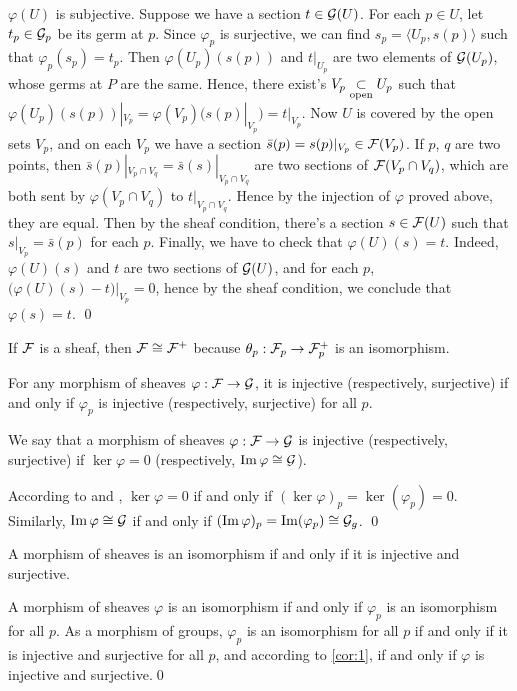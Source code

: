 \documentclass[10pt]{extbook}
\begin{document}
$\varphi(U)$ is subjective. Suppose we have a section $t\in\mathcal{G}(U)$. For each $p\in U$, 
let $t_p\in\mathcal{G}_p$ be its germ at $p$. Since $\varphi_p$ is surjective, we can find $s_p=\langle U_p,s(p)\rangle$ such that $\varphi_p(s_p)=t_p$. Then $\varphi(U_p)(s(p))$ and $t|_{U_p}$ are two elements of $\mathcal{G}(U_p)$, whose germs at $P$ are the same. Hence, there exist's $V_p\underset{\mathrm{open}}{\subset} U_p$ such that $\varphi(U_p)(s(p))|_{V_p}=\varphi(V_p)(s(p)|_{V_p})=t|_{V_p}$. Now $U$ is covered by the open sets $V_p$, and on each $V_p$ we have a section $\bar{s}(p)=s(p)|_{V_p}\in \mathcal{F}(V_p)$. If $p$, $q$ are two points, then $\bar{s}(p)|_{V_p\cap V_q}=\bar{s}(s)|_{V_p\cap V_q}$ are two sections of $\mathcal{F}(V_p\cap V_q)$, which are both sent by $\varphi(V_p\cap V_q)$ to $t|_{V_p\cap V_q}$. Hence by the injection of $\varphi$ proved above, they are equal. Then by the sheaf condition, there's a section $s\in\mathcal{F}(U)$ such that $s|_{V_p}=\bar{s}(p)$ for each $p$. Finally, we have to check that $\varphi(U)(s)=t$. Indeed, $\varphi(U)(s)$ and $t$ are two sections of $\mathcal{G}(U)$, and for each $p$, $\bigl(\varphi(U)(s)-t\bigr)|_{V_p}=0$, hence by the sheaf condition, we conclude that $\varphi(s)=t$. \qed

\para If $\mathcal{F}$ is a sheaf, then $\mathcal{F}\cong \mathcal{F}^+$ because 
$\theta_p:\mathcal{F}_p\to \mathcal{F}^+_p$ is an isomorphism.

\para \label{cor:1} For any morphism of sheaves $\varphi:\mathcal{F}\to\mathcal{G}$, it is injective
(respectively, surjective) if and only if $\varphi_p$ is injective (respectively, 
surjective) for all $p$.

\para We say that a morphism of sheaves $\varphi:\mathcal{F}\to\mathcal{G}$ is injective (respectively, 
surjective) if $\ker\varphi=0$ (respectively, $\operatorname{Im}\varphi\cong\mathcal{G}$).

\proof According to  and , $\ker \varphi=0$ if and only if 
$(\ker \varphi)_p=\ker(\varphi_p)=0$. Similarly, $\operatorname{Im} \varphi\cong \mathcal{G}$ if and only 
if $(\operatorname{Im} \varphi)_p=\operatorname{Im}(\varphi_p)\cong \mathcal{G}_g$. \qed

\para A morphism of sheaves is an isomorphism if and only if it is injective and surjective.

\proof A morphism of sheaves $\varphi$ is an isomorphism if and only if $\varphi_p$ is 
an isomorphism for all $p$. As a morphism of groups, $\varphi_p$ is an isomorphism for 
all $p$ if and only if it is injective and surjective for all $p$, and according to 
\eqref{cor:1}, if and only if $\varphi$ is injective and surjective.\qed
\end{document}
